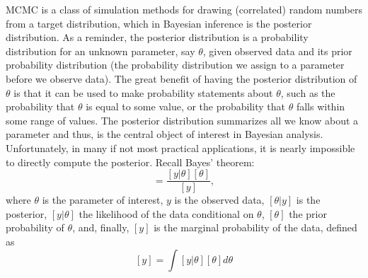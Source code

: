 MCMC is a class of simulation methods for
drawing (correlated) random numbers from a target distribution, which
in Bayesian inference is the posterior distribution.
As a reminder, the posterior distribution is a probability
distribution for an unknown parameter, say $\theta$, given 
observed data and its prior probability distribution (the probability
distribution we assign to a parameter before we observe data).  The
great benefit of having the posterior distribution of $\theta$ is
that it can be used to make probability statements about $\theta$,
such as the probability that $\theta$ is equal to some value, or the
probability that $\theta$ falls within some range of values. 
The posterior distribution summarizes all we know about a parameter
and thus, is the central object of interest in Bayesian
analysis. Unfortunately, in many if not most practical applications,
it is nearly impossible to directly compute the posterior. Recall
Bayes' theorem:
\begin{equation}
[\theta|y] = \frac{[y|\theta] [\theta]}  {[y]},
\label{mcmc.eq.bayes}
\end{equation}
where $\theta$ is the parameter of interest, $y$ is the observed data,
$[\theta|y]$ is the posterior, $[y|\theta]$ the likelihood of the
data conditional on $\theta$, $[\theta]$ the prior probability of
$\theta$, and, finally, $[y]$ is the marginal probability of the
data, defined as 
\[
[y] = \int [y|\theta]  [\theta] d\theta
\]

